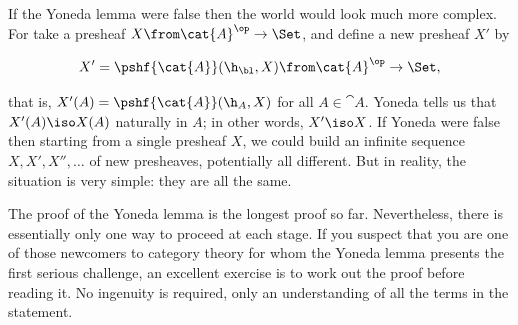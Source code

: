 If the Yoneda lemma were false then the world would look much more complex.
For take a presheaf $X\from \cat{A}^\op \to \Set$, and define a new
presheaf $X'$ by

\[
X' = \pshf{\cat{A}}(\h_\bl, X)
\from 
\cat{A}^\op \to \Set,
\]

that is, $X'(A) = \pshf{\cat{A}}(\h_A, X)$ for all $A \in \cat{A}$.  Yoneda
tells us that $X'(A) \iso X(A)$ naturally in $A$; in other words, $X' \iso
X$.  If Yoneda were false then starting from a single presheaf $X$, we
could build an infinite sequence $X, X', X'', \ldots$ of new presheaves,
potentially all different.  But in reality, the situation is very simple:
they are all the same.

The proof of the Yoneda lemma is the longest proof so far.  Nevertheless,
there is essentially only one way to proceed at each stage.  If you suspect
that you are one of those newcomers to category theory for whom the Yoneda
lemma presents the first serious challenge, an excellent exercise is to
work out the proof before reading it.  No ingenuity is required, only an
understanding of all the terms in the statement.

